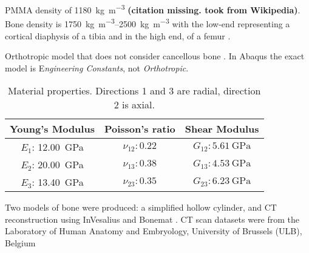 PMMA density of \SI{1180}{\kilo\gram\per\metre\cubed} \textbf{(citation missing. took from Wikipedia)}. Bone density is \SIrange{1750}{2500}{\kilo\gram\per\metre\cubed} with the low-end representing a cortical diaphysis of a tibia \cite{helgason_mathematical_2008} and in the high end, of a femur \cite{treece_imaging_2012}.

Orthotropic model that does not consider cancellous bone \cite{ahmed_experimental_2020, ashman_continuous_1984}. In Abaqus the exact model is E\emph{ngineering Constants}, not \emph{Orthotropic}.
\begin{table}[h]
\centering
\begin{tabular}{ccc}
    \textbf{Young's Modulus} & \textbf{Poisson's ratio} & \textbf{Shear Modulus} \\ \hline
    $E_1$: \SI{12.00}{\giga\pascal} & $ \nu_{12}: 0.22 $ & $G_{12}: \SI{5.61}{\giga\pascal}$ \\
    $E_2$: \SI{20.00}{\giga\pascal} & $ \nu_{13}: 0.38 $ & $G_{13}: \SI{4.53}{\giga\pascal}$ \\
    $E_3$: \SI{13.40}{\giga\pascal} & $ \nu_{23}: 0.35 $ & $G_{23}: \SI{6.23}{\giga\pascal}$
\end{tabular}
\caption{Material properties. Directions 1 and 3 are radial, direction 2 is axial.}
\label{tb:orthotropic-model-properties}
\end{table}

Two models of bone were produced: a simplified hollow cylinder, and CT reconstruction using InVesalius \cite{amorim_invesalius_2015} and Bonemat \cite{taddei_material_2007,schileo_cortical_2020}.
CT scan datasets were from the Laboratory of Human Anatomy and Embryology, University of Brussels (ULB), Belgium